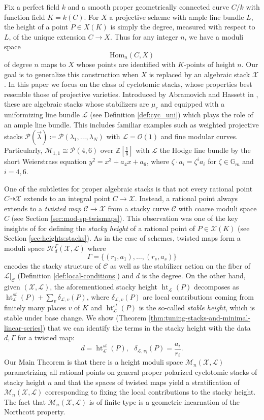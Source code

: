 \documentclass[a4paper,12pt]{amsart}
\theoremstyle{definition}
\newcommand{\bZ}{\mathbb{Z}}
\newcommand{\cX}{\mathcal{X}}
\newcommand{\cO}{\mathcal{O}}
\newcommand{\cC}{\mathcal{C}}
\newcommand{\cL}{\mathcal{L}}
\newcommand{\cH}{\mathcal{H}}
\newcommand{\cM}{\mathcal{M}}
\DeclareMathOperator{\height}{ht}
\newcommand{\iso}{\cong}
\newcommand{\Me}{\overline{\mathcal{M}}_{1,1}}
\newcommand{\Pcv}{\mathcal{P}(\vec{\lambda})}
\newcommand{\Pc}{\mathcal{P}}
\newcommand{\Gb}{\mathbb{G}}
\begin{document}
	Fix a perfect field $k$ and a smooth proper geometrically connected curve $C/k$ with function field $K = k(C)$. For $X$ a projective scheme with ample line bundle $L$, the height of a point $P \in X(K)$ is simply the degree, measured with respect to $L$, of the unique extension $C \to X$. Thus for any integer $n$, we have a moduli space
	$$
	\mathrm{Hom}_n(C, X)
	$$
	of degree $n$ maps to $X$ whose points are identified with $K$-points of height $n$. Our goal is to generalize this construction when $X$ is replaced by an algebraic stack $\cX$. In this paper we focus on the class of cyclotomic stacks, whose properties best resemble those of projective varieties. Introduced by Abramovich and Hassett in \cite{AH}, these are algebraic stacks whose stabilizers are $\mu_r$ and equipped with a uniformizing line bundle $\cL$ (see Definition \ref{def:cyc_uni}) which plays the role of an ample line bundle. This includes familiar examples such as weighted projective stacks $\Pcv \coloneqq \Pc(\lambda_1,\dots,\lambda_N)$ with $\cL=\cO(1)$ and fine modular curves. Particularly, $\Me \iso \Pc(4,6)$ over $\bZ\left[\frac{1}{6}\right]$ with $\cL$ the Hodge line bundle by the short Weierstrass equation $y^2 = x^3 + a_4x + a_6$, where $\zeta \cdot a_i=\zeta^i a_i$ for $\zeta \in \Gb_m$ and $i=4,6$.
	
	\medskip
	
	One of the subtleties for proper algebraic stacks is that not every rational point $C \dashrightarrow \cX$ extends to an integral point $C \to \cX$. Instead, a rational point always extends to a \emph{twisted map} $\cC \to \cX$ from a stacky curve $\cC$ with coarse moduli space $C$ (see Section \ref{sec:mod-sp-twismaps}). This observation was one of the key insights of \cite{ESZB} for defining the \emph{stacky height} of a rational point of $P \in \cX(K)$ (see Section \ref{sec:heights:stacks}).  As in the case of schemes, twisted maps form a moduli space $\cH^\Gamma_d(\cX, \cL)$ where 
	$$
	\Gamma = \{(r_1, a_1), \ldots, (r_s, a_s)\}
	$$
	encodes the stacky structure of $\cC$ as well as the stabilizer action on the fiber of $\cL|_{\cC}$ (Definition \ref{def:local-conditions}) and $d$ is the degree. On the other hand, given $(\cX, \cL)$, the aforementioned stacky height $\height_{\cL}(P)$ decomposes as $\height_{\cL}^{st}(P)+\sum_v \delta_{\cL,v}(P)$, where $\delta_{\cL,v}(P)$ are local contributions coming from finitely many places $v$ of $K$ and $\height_{\cL}^{st}(P)$ is the so-called \emph{stable height}, which is stable under base change. We show (Theorem \ref{thm:tuning-stacks-and-minimal-linear-series}) that we can identify the terms in the stacky height with the data $d, \Gamma$ for a twisted map:
	$$
	d = \height_{\cL}^{st}(P), \ \ \ \delta_{\cL,v_i}(P) = \frac{a_i}{r_i}. 
	$$
	Our Main Theorem is that there is a height moduli space $\cM_n(\cX, \cL)$ parametrizing all rational points on general proper polarized cyclotomic stacks of stacky height $n$ and that the spaces of twisted maps yield a stratification of $\cM_n(\cX,\cL)$ corresponding to fixing the local contributions to the stacky height. The fact that $\cM_n(\cX, \cL)$ is of finite type is a geometric incarnation of the Northcott property. 
	
\end{document}
